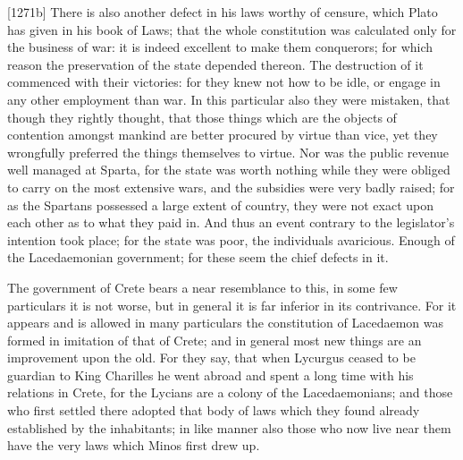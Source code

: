 [1271b] There is also another defect in his laws worthy of censure, which
Plato has given in his book of Laws; that the whole constitution was
calculated only for the business of war: it is indeed excellent to make
them conquerors; for which reason the preservation of the state depended
thereon. The destruction of it commenced with their victories: for they
knew not how to be idle, or engage in any other employment than war. In
this particular also they were mistaken, that though they rightly thought,
that those things which are the objects of contention amongst mankind are
better procured by virtue than vice, yet they wrongfully preferred the
things themselves to virtue. Nor was the public revenue well managed at
Sparta, for the state was worth nothing while they were obliged to carry
on the most extensive wars, and the subsidies were very badly raised; for
as the Spartans possessed a large extent of country, they were not exact
upon each other as to what they paid in. And thus an event contrary to the
legislator's intention took place; for the state was poor, the individuals
avaricious. Enough of the Lacedaemonian government; for these seem the
chief defects in it.


The government of Crete bears a near resemblance to this, in some few
particulars it is not worse, but in general it is far inferior in its
contrivance. For it appears and is allowed in many particulars the
constitution of Lacedaemon was formed in imitation of that of Crete; and
in general most new things are an improvement upon the old. For they say,
that when Lycurgus ceased to be guardian to King Charilles he went abroad
and spent a long time with his relations in Crete, for the Lycians are a
colony of the Lacedaemonians; and those who first settled there adopted
that body of laws which they found already established by the inhabitants;
in like manner also those who now live near them have the very laws which
Minos first drew up.

